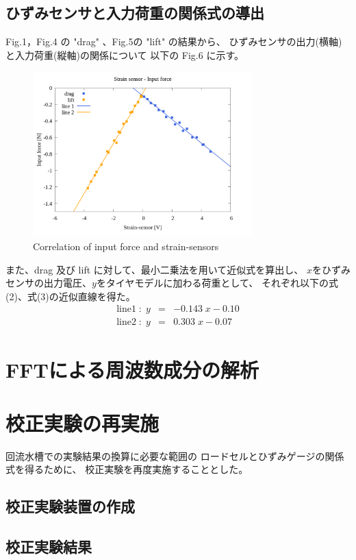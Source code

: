\documentclass[twocolumn,a4j]{jsarticle}
\begin{document}
\subsection{ひずみセンサと入力荷重の関係式の導出}
Fig.1，Fig.4 の "drag" 、Fig.5の "lift" の結果から、
ひずみセンサの出力(横軸)と入力荷重(縦軸)の関係について
以下の Fig.6 に示す。\par
\begin{figure}[htbp]
    \footnotesize
    \begin{center}
        \includegraphics[width=85mm]{../images/08_strainsensor-forces&line.png}
        \caption{Correlation of input force and strain-sensors}
    \end{center}
\end{figure}
また、drag 及び lift に対して、最小二乗法を用いて近似式を算出し、
$x$をひずみセンサの出力電圧、$y$をタイヤモデルに加わる荷重として、
それぞれ以下の式(2)、式(3)の近似直線を得た。
\begin{eqnarray}
    \mathrm{line 1} \; : \; y &=& -0.143 \; x - 0.10\\
    \mathrm{line 2} \; : \; y &=& 0.303 \; x - 0.07
\end{eqnarray}

\section{FFTによる周波数成分の解析}

\section{校正実験の再実施}
回流水槽での実験結果の換算に必要な範囲の
ロードセルとひずみゲージの関係式を得るために、
校正実験を再度実施することとした。

\subsection{校正実験装置の作成}

\subsection{校正実験結果}
\end{document}
